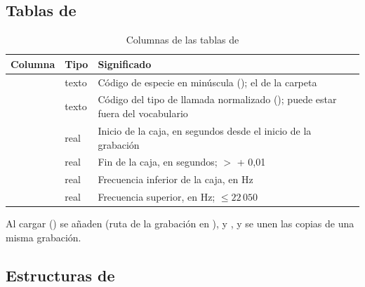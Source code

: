 \documentclass[12pt,a4paper]{article}
\begin{document}
\subsection{Tablas de }

\begin{table}[htbp]
    \centering
    \caption{Columnas de las tablas de }
    \label{tab:cleaned}
    \small
    \begin{tabular}{@{}llL{8.0cm}@{}}
        \toprule
        \textbf{Columna} & \textbf{Tipo} & \textbf{Significado} \\
        \midrule
         & texto & Código de especie en minúscula (); el de la carpeta \\
         & texto & Código del tipo de llamada normalizado (); puede estar fuera del vocabulario \\
         & real & Inicio de la caja, en segundos desde el inicio de la grabación \\
         & real & Fin de la caja, en segundos; $>$  + 0,01 \\
         & real & Frecuencia inferior de la caja, en Hz \\
         & real & Frecuencia superior, en Hz; $\leq 22\,050$ \\
        \bottomrule
    \end{tabular}
\end{table}

Al cargar () se añaden  (ruta de
la grabación en ),  y , y se unen las copias
de una misma grabación.

\subsection{Estructuras de }
\end{document}
